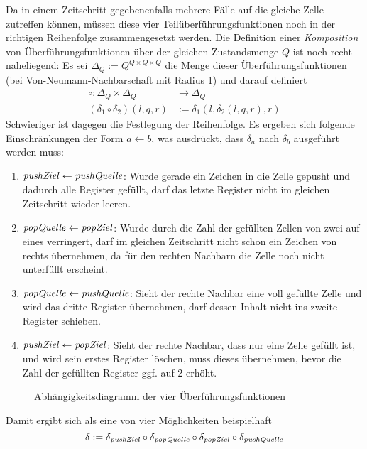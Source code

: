 \documentclass{article}
\begin{document}
Da in einem Zeitschritt gegebenenfalls mehrere Fälle auf die gleiche Zelle zutreffen können, müssen diese vier Teilüberführungsfunktionen noch in der richtigen Reihenfolge zusammengesetzt werden. Die Definition einer \emph{Komposition} von Überführungsfunktionen über der gleichen Zustandsmenge $Q$ ist noch recht naheliegend: Es sei $\Delta_Q := Q^{Q \times Q \times Q}$ die Menge dieser Überführungsfunktionen (bei Von-Neumann-Nachbarschaft mit Radius 1) und darauf definiert
\begin{align*}
    \circ : \Delta_Q \times \Delta_Q &\rightarrow \Delta_Q \\
    (\delta_1 \circ \delta_2)(l,q,r) &:= \delta_1(l,\delta_2(l,q,r),r)
\end{align*}
Schwieriger ist dagegen die Festlegung der Reihenfolge. Es ergeben sich folgende Einschränkungen der Form $a \leftarrow b$, was ausdrückt, dass $\delta_a$ nach $\delta_b$ ausgeführt werden muss:
\begin{enumerate}
    \item $\mathit{pushZiel} \leftarrow \mathit{pushQuelle}$: Wurde gerade ein Zeichen in die Zelle gepusht und dadurch alle Register gefüllt, darf \pushQuelle das letzte Register nicht im gleichen Zeitschritt wieder leeren.
    \item $\mathit{popQuelle} \leftarrow \mathit{popZiel}$: Wurde durch \popQuelle die Zahl der gefüllten Zellen von zwei auf eines verringert, darf \popZiel im gleichen Zeitschritt nicht schon ein Zeichen von rechts übernehmen, da für den rechten Nachbarn die Zelle noch nicht unterfüllt erscheint.
    \item $\mathit{popQuelle} \leftarrow \mathit{pushQuelle}$: Sieht der rechte Nachbar eine voll gefüllte Zelle und wird das dritte Register übernehmen, darf \popQuelle dessen Inhalt nicht ins zweite Register schieben.
    \item $\mathit{pushZiel} \leftarrow \mathit{popZiel}$: Sieht der rechte Nachbar, dass nur eine Zelle gefüllt ist, und wird sein erstes Register löschen, muss \popZiel dieses übernehmen, bevor \pushZiel die Zahl der gefüllten Register ggf. auf 2 erhöht.
\end{enumerate}

\begin{figure}[h]
    \centering
    \caption{Abhängigkeitsdiagramm der vier Überführungsfunktionen}
\end{figure}
Damit ergibt sich als eine von vier Möglichkeiten beispielhaft
\[ \delta := \delta_{\mathit{pushZiel}} \circ \delta_{\mathit{popQuelle}} \circ \delta_{\mathit{popZiel}} \circ \delta_{\mathit{pushQuelle}} \]
\end{document}
